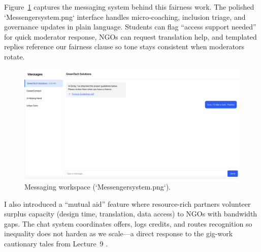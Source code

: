 Figure~\ref{fig:chat-system} captures the messaging system behind this fairness work. The polished `Messengersystem.png` interface handles micro-coaching, inclusion triage, and governance updates in plain language. Students can flag ``access support needed'' for quick moderator response, NGOs can request translation help, and templated replies reference our fairness clause so tone stays consistent when moderators rotate.

\begin{figure}[h]
  \centering
  \includegraphics[width=0.85\linewidth]{figures/Messengersystem.png}
  \caption{Messaging workspace (`Messengersystem.png`).}
  \label{fig:chat-system}
\end{figure}

I also introduced a ``mutual aid'' feature where resource-rich partners volunteer surplus capacity (design time, translation, data access) to NGOs with bandwidth gaps. The chat system coordinates offers, logs credits, and routes recognition so inequality does not harden as we scale---a direct response to the gig-work cautionary tales from Lecture~9 \citep{Lecture09}.
